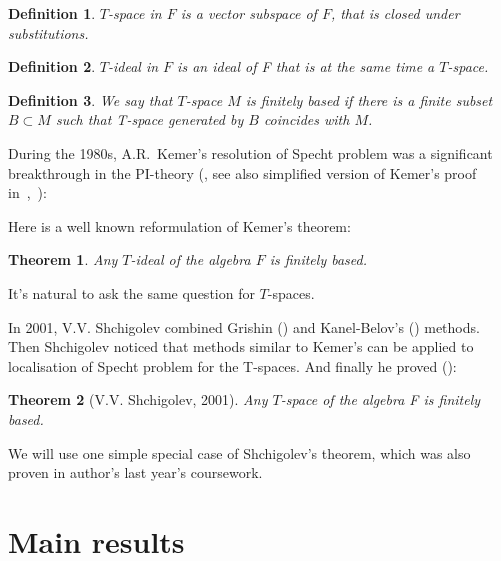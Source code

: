 \documentclass[12pt,a4paper]{article}
\newtheorem*{theorem*}{Theorem}
\newtheorem{definition}{Definition}[subsection]
\begin{document}
    \vskip 0.1in\noindent
    \begin{definition}
        $T$-space in $F$ is a vector subspace of $F$, that is closed under substitutions.
    \end{definition}
    \vskip 0.1in\noindent

    \vskip 0.1in\noindent
    \begin{definition}
        $T$-ideal in $F$ is an ideal of F that is at the same time a $T$-space.
    \end{definition}
    \vskip 0.1in\noindent

    \vskip 0.1in\noindent
    \begin{definition}
        We say that $T$-space $M$ is finitely based if there is a finite subset $B\subset M$ such that T-space generated by $B$ coincides with $M$.
    \end{definition}
    \vskip 0.1in\noindent

    During the 1980s, A.R.\ Kemer's resolution of Specht problem was a significant breakthrough in the PI-theory (\cite{Kemer}, see also simplified version of Kemer's proof in~\cite{Aljadeff-Kanel-Karasik},~\cite{Procesi}):

    Here is a well known reformulation of Kemer's theorem:

    \vskip 0.1in\noindent
    \begin{theorem*}
        Any $T$-ideal of the algebra $F$ is finitely based.
    \end{theorem*}
    \vskip 0.1in\noindent

    It's natural to ask the same question for $T$-spaces.

    In 2001, V.V. Shchigolev combined Grishin (\cite{Grishin}) and Kanel-Belov's (\cite{Kanel}) methods.
    Then Shchigolev noticed that methods similar to Kemer's can be applied to localisation of Specht problem for the T-spaces.
    And finally he proved (\cite{Shchigolev}):

    \vskip 0.1in\noindent
    \begin{theorem*} [V.V. Shchigolev, 2001]
        Any $T$-space of the algebra F is finitely based.
    \end{theorem*}
    \vskip 0.1in\noindent

    We will use one simple special case of Shchigolev's theorem, which was also proven in author's last year's coursework.


    \section{Main results}
\end{document}
